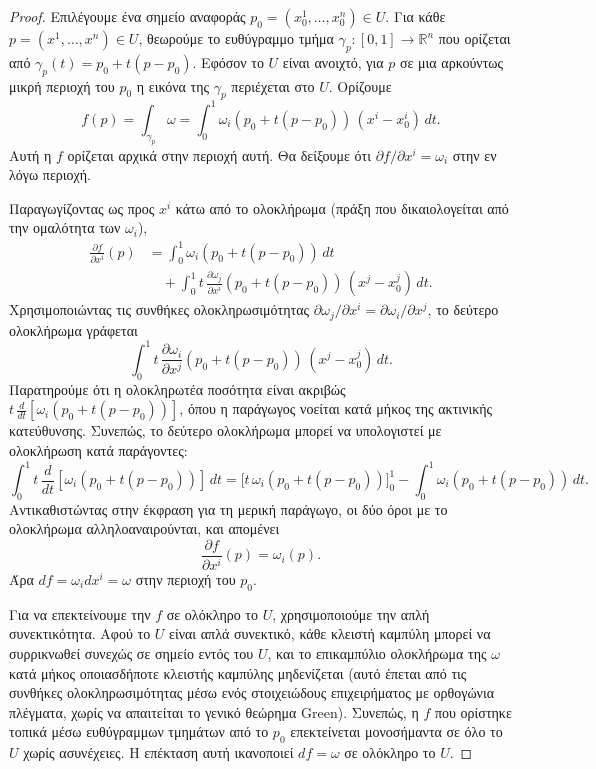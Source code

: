 \documentclass[11pt,a4paper,twoside,openright]{book}
\begin{document}
\begin{proof}
Επιλέγουμε ένα σημείο αναφοράς $p_0 = (x_0^1, \dots, x_0^n) \in U$. Για κάθε $p = (x^1, \dots, x^n) \in U$, θεωρούμε το ευθύγραμμο τμήμα $\gamma_p: [0,1] \to \mathbb{R}^n$ που ορίζεται από $\gamma_p(t) = p_0 + t(p - p_0)$. Εφόσον το $U$ είναι ανοιχτό, για $p$ σε μια αρκούντως μικρή περιοχή του $p_0$ η εικόνα της $\gamma_p$ περιέχεται στο $U$. Ορίζουμε
\[
f(p) = \int_{\gamma_p} \omega = \int_{0}^{1} \omega_i(p_0 + t(p - p_0)) \, (x^i - x_0^i) \, dt.
\]
Αυτή η $f$ ορίζεται αρχικά στην περιοχή αυτή. Θα δείξουμε ότι $\partial f / \partial x^i = \omega_i$ στην εν λόγω περιοχή.

Παραγωγίζοντας ως προς $x^i$ κάτω από το ολοκλήρωμα (πράξη που δικαιολογείται από την ομαλότητα των $\omega_i$),
\begin{align*}
\frac{\partial f}{\partial x^i}(p) &= \int_{0}^{1} \omega_i(p_0 + t(p - p_0)) \, dt \\
&\quad + \int_{0}^{1} t \, \frac{\partial \omega_j}{\partial x^i}(p_0 + t(p - p_0)) \, (x^j - x_0^j) \, dt.
\end{align*}
Χρησιμοποιώντας τις συνθήκες ολοκληρωσιμότητας $\partial \omega_j / \partial x^i = \partial \omega_i / \partial x^j$, το δεύτερο ολοκλήρωμα γράφεται
\[
\int_{0}^{1} t \, \frac{\partial \omega_i}{\partial x^j}(p_0 + t(p - p_0)) \, (x^j - x_0^j) \, dt.
\]
Παρατηρούμε ότι η ολοκληρωτέα ποσότητα είναι ακριβώς $t \, \frac{d}{dt}[\omega_i(p_0 + t(p - p_0))]$, όπου η παράγωγος νοείται κατά μήκος της ακτινικής κατεύθυνσης. Συνεπώς, το δεύτερο ολοκλήρωμα μπορεί να υπολογιστεί με ολοκλήρωση κατά παράγοντες:
\[
\int_{0}^{1} t \, \frac{d}{dt}[\omega_i(p_0 + t(p - p_0))] \, dt = \Big[ t \, \omega_i(p_0 + t(p - p_0)) \Big]_{0}^{1} - \int_{0}^{1} \omega_i(p_0 + t(p - p_0)) \, dt.
\]
Αντικαθιστώντας στην έκφραση για τη μερική παράγωγο, οι δύο όροι με το ολοκλήρωμα αλληλοαναιρούνται, και απομένει
\[
\frac{\partial f}{\partial x^i}(p) = \omega_i(p).
\]
Άρα $df = \omega_i dx^i = \omega$ στην περιοχή του $p_0$.

Για να επεκτείνουμε την $f$ σε ολόκληρο το $U$, χρησιμοποιούμε την απλή συνεκτικότητα. Αφού το $U$ είναι απλά συνεκτικό, κάθε κλειστή καμπύλη μπορεί να συρρικνωθεί συνεχώς σε σημείο εντός του $U$, και το επικαμπύλιο ολοκλήρωμα της $\omega$ κατά μήκος οποιασδήποτε κλειστής καμπύλης μηδενίζεται (αυτό έπεται από τις συνθήκες ολοκληρωσιμότητας μέσω ενός στοιχειώδους επιχειρήματος με ορθογώνια πλέγματα, χωρίς να απαιτείται το γενικό θεώρημα Green). Συνεπώς, η $f$ που ορίστηκε τοπικά μέσω ευθύγραμμων τμημάτων από το $p_0$ επεκτείνεται μονοσήμαντα σε όλο το $U$ χωρίς ασυνέχειες. Η επέκταση αυτή ικανοποιεί $df = \omega$ σε ολόκληρο το $U$.
\end{proof}
\end{document}
